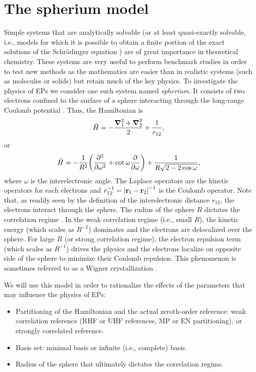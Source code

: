 \documentclass[11pt,a4paper]{article}
\newcommand{\hH}{\Hat{H}}
\begin{document}
\section{The spherium model}\label{sec:spherium}

Simple systems that are analytically solvable (or at least quasi-exactly solvable, i.e., models for which it is possible to obtain a finite portion of the exact solutions of the Schr{\"o}dinger equation \cite{Ushveridze_1994}) are of great importance in theoretical chemistry. 
These systems are very useful to perform benchmark studies in order to test new methods as the mathematics are easier than in realistic systems (such as molecules or solids) but retain much of the key physics. 
To investigate the physics of EPs we consider one such system named \textit{spherium}. 
It consists of two electrons confined to the surface of a sphere interacting through the long-range Coulomb potential \cite{Thompson_2005, Seidl_2007, Loos_2009b}. 
Thus, the Hamiltonian is
\begin{equation}
	\hH = -\frac{\grad_1^2 + \grad_2^2}{2} + \frac{1}{r_{12}},
\end{equation}
or
\begin{equation} \label{eq:H-sph-omega}
	\hH = -\frac{1}{R^2} \qty( \pdv[2]{}{\omega} + \cot \omega \pdv{}{\omega}) + \frac{1}{R \sqrt{2 - 2 \cos \omega}},
\end{equation}
where $\omega$ is the interelectronic angle.
The Laplace operators are the kinetic operators for each electrons and $r_{12}^{-1} = \abs{\vb{r}_1 - \vb{r}_2}^{-1}$ is the Coulomb operator. 
Note that, as readily seen by the definition of the interelectronic distance $r_{12}$, the electrons interact through the sphere.
The radius of the sphere $R$ dictates the correlation regime \cite{Loos_2009}. 
In the weak correlation regime (i.e., small $R$), the kinetic energy (which scales as $R^{-2}$) dominates and the electrons are delocalized over the sphere.
For large $R$ (or strong correlation regime), the electron repulsion term (which scales as $R^{-1}$) drives the physics and the electrons localize on opposite side of the sphere to minimize their Coulomb repulsion. 
This phenomenon is sometimes referred to as a Wigner crystallization \cite{Wigner_1934}.

We will use this model in order to rationalize the effects of the parameters that may influence the physics of EPs:
\begin{itemize}
	\item Partitioning of the Hamiltonian and the actual zeroth-order reference: weak correlation reference (RHF or UHF references, MP or EN partitioning), or strongly correlated reference.
	\item Basis set: minimal basis or infinite (i.e., complete) basis.
	\item Radius of the sphere that ultimately dictates the correlation regime.
\end{itemize}
\end{document}
